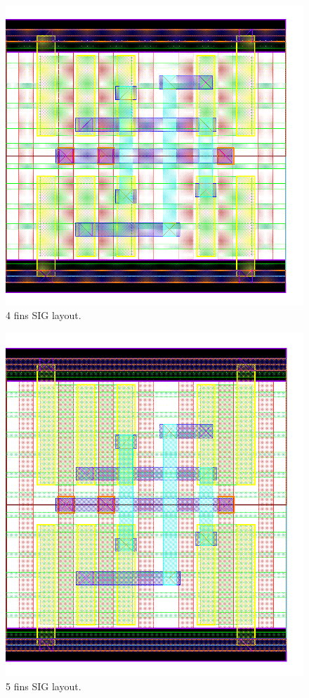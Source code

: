 \documentclass[pgmicro,mestrado,english]{iiufrgs}
\begin{document}
\begin{figure}[H]
\centering
\includegraphics[width=\textwidth,height=\textheight,keepaspectratio]{SIG4F.png}
\caption{4 fins SIG layout.}
\label{fig:SIG4F}
\end{figure}

\begin{figure}[H]
\centering
\includegraphics[width=\textwidth,height=\textheight,keepaspectratio]{SIG5F.png}
\caption{5 fins SIG layout.}
\label{fig:SIG5F}
\end{figure}
\end{document}
